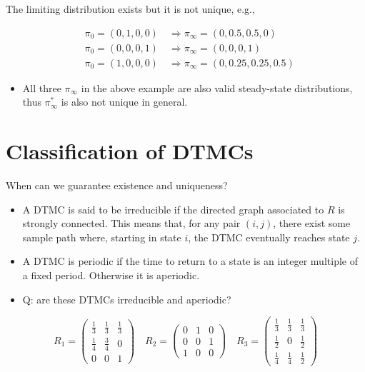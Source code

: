 \documentclass[10pt]{article}
\begin{document}
The limiting distribution exists but it is not unique, e.g.,

$$
\begin{aligned}
& \pi_{0}=(0,1,0,0) \quad \Rightarrow \pi_{\infty}=(0,0.5,0.5,0) \\
& \pi_{0}=(0,0,0,1) \quad \Rightarrow \pi_{\infty}=(0,0,0,1) \\
& \pi_{0}=(1,0,0,0) \quad \Rightarrow \pi_{\infty}=(0,0.25,0.25,0.5)
\end{aligned}
$$

\begin{itemize}
  \item All three $\pi_{\infty}$ in the above example are also valid steady-state distributions, thus $\pi_{\infty}^{*}$ is also not unique in general.
\end{itemize}

\section*{Classification of DTMCs}
When can we guarantee existence and uniqueness?

\begin{itemize}
  \item A DTMC is said to be irreducible if the directed graph associated to $R$ is strongly connected. This means that, for any pair $(i, j)$, there exist some sample path where, starting in state $i$, the DTMC eventually reaches state $j$.
  \item A DTMC is periodic if the time to return to a state is an integer multiple of a fixed period. Otherwise it is aperiodic.
  \item Q: are these DTMCs irreducible and aperiodic?
\end{itemize}

$$
R_{1}=\left(\begin{array}{ccc}
\frac{1}{3} & \frac{1}{3} & \frac{1}{3} \\
\frac{1}{4} & \frac{3}{4} & 0 \\
0 & 0 & 1
\end{array}\right) \quad R_{2}=\left(\begin{array}{ccc}
0 & 1 & 0 \\
0 & 0 & 1 \\
1 & 0 & 0
\end{array}\right) \quad R_{3}=\left(\begin{array}{ccc}
\frac{1}{3} & \frac{1}{3} & \frac{1}{3} \\
\frac{1}{2} & 0 & \frac{1}{2} \\
\frac{1}{4} & \frac{1}{4} & \frac{1}{2}
\end{array}\right)
$$
\end{document}

